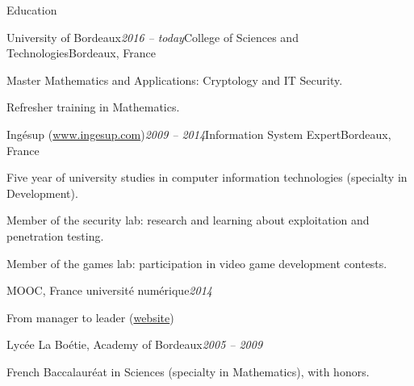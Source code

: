 \begin{rSection}{Education}

  \begin{rSubsection}{University of Bordeaux}{\em 2016 -- today}{College of Sciences and Technologies}{Bordeaux, France}
    \item Master Mathematics and Applications: Cryptology and IT Security.
    \item Refresher training in Mathematics.
  \end{rSubsection}

  \begin{rSubsection}{Ingésup (\href{www.ingesup.com}{www.ingesup.com})}{\em 2009 -- 2014}{Information System Expert}{Bordeaux, France}
    \item[] Five year of university studies in computer information technologies (specialty in Development).
    \item Member of the security lab: research and learning about exploitation and penetration testing.
    \item Member of the games lab: participation in video game development contests.
  \end{rSubsection}

  \begin{rSubsection}{MOOC, France université numérique}{\em 2014}{}{}
    \item[] From manager to leader (\href{https://www.france-universite-numerique-mooc.fr/courses/CNAM/01002/Trimestre_1_2014/about}{website})
  \end{rSubsection}

  \begin{rSubsection}{Lycée La Boétie, Academy of Bordeaux}{\em 2005 -- 2009}{}{}
    \item[] French Baccalauréat in Sciences (specialty in Mathematics), with honors.
  \end{rSubsection}

\end{rSection}
